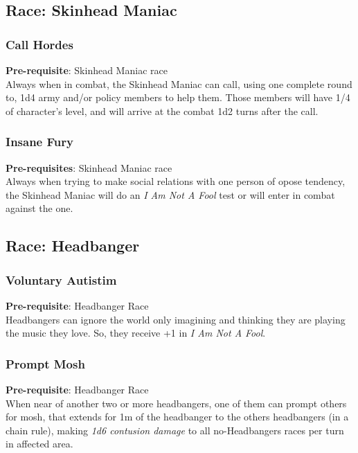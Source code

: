 \documentclass[ letterpaper,12pt]{article}
\begin{document}
\subsection{Race: Skinhead Maniac}

\subsubsection{Call Hordes}
 {\bf Pre-requisite}: Skinhead Maniac race\\
 Always when in combat, the Skinhead Maniac can call, using one complete round to, 1d4 army and/or policy members to help them. Those members will have 1/4 of character's level, and will arrive at the combat 1d2 turns after the call.

\subsubsection{Insane Fury}
 {\bf Pre-requisites}: Skinhead Maniac race\\
 Always when trying to make social relations with one person of opose tendency, the Skinhead Maniac will do an {\it I Am Not A Fool} test or will enter in combat against the one.

\subsection{Race: Headbanger}

\subsubsection{Voluntary Autistim}
{\bf Pre-requisite}: Headbanger Race\\
Headbangers can ignore the world only imagining and thinking they are playing the music they love. So, they receive +1 in {\it I Am Not A Fool}.\\

\subsubsection{Prompt Mosh}
 {\bf Pre-requisite}: Headbanger Race\\
 When near of another two or more headbangers, one of them can prompt others for mosh, that extends for 1m of the headbanger to the others headbangers (in a chain rule), making {\it 1d6 contusion damage} to all no-Headbangers races per turn in affected area.
\end{document}
